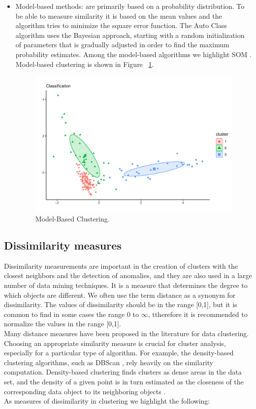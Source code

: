 \begin{itemize}
  \item Model-based methods: are primarily based on a probability distribution. To be able to measure similarity it is based on the mean values and the algorithm tries to minimize the square error function. The Auto Class algorithm uses the Bayesian approach, starting with a random initialization of parameters that is gradually adjusted in order to find the maximum probability estimates. Among the model-based algorithms we highlight SOM \citep{b34}. Model-based clustering is shown in Figure ~\ref{fig:model}.
    \begin{figure}[htbp]
  \centering
   \includegraphics[width=0.9\linewidth, height=0.16\textheight]{img/model.pdf}
    \caption{Model-Based Clustering.}
    \label{fig:model}%
\end{figure}
\end{itemize}

\subsection {Dissimilarity measures}

Dissimilarity measurements are important in the creation of clusters with the closest neighbors and the detection of anomalies, and they are also used in a large number of data mining techniques. It is a measure that determines the degree to which objects are different. We often use the term distance as a synonym for dissimilarity. The values of dissimilarity should be in the range [0,1], but it is common to find in some cases the range 0 to $\infty$, ttherefore it is recommended to normalize the values in the range [0,1].
\\
Many distance measures have been proposed in the literature for data clustering. Choosing an appropriate similarity measure is crucial for cluster analysis, especially for a particular type of algorithm. For example, the density-based clustering algorithms, such as DBScan \citep{b28}, rely heavily on the similarity computation. Density-based clustering finds clusters as dense areas in the data set, and the density of a given point is in turn estimated as the closeness of the corresponding data object to its neighboring objects \citep{b50} \citep{b51}.
\\
As measures of dissimilarity in clustering we highlight the following:


